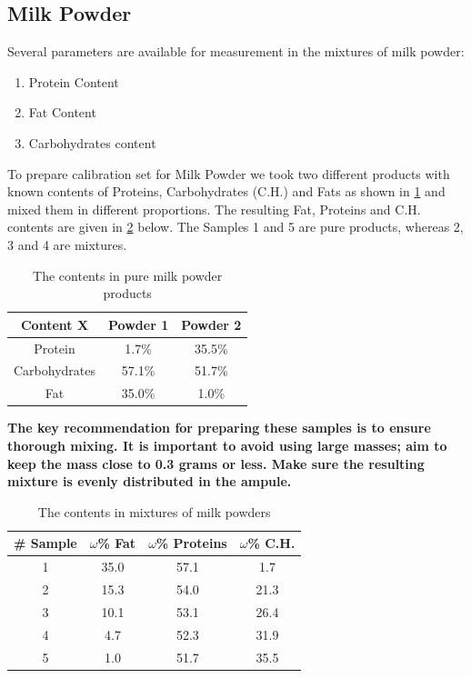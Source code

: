 \documentclass[a4paper,12pt]{article}
\begin{document}
\subsection{Milk Powder}
\label{sec:Milk Powder}
Several parameters are available for measurement in the mixtures of milk powder:
\begin{enumerate}
    \item Protein Content
    \item Fat Content
    \item Carbohydrates content
\end{enumerate}

To prepare calibration set for Milk Powder we took two different products with known contents of Proteins, Carbohydrates (C.H.) and Fats as shown in \cref{tab:Milk Pure}  and mixed them in different proportions. The resulting Fat, Proteins and C.H. contents are given in \cref{tab:Milk Mixture} below.
The Samples 1 and 5 are pure products, whereas 2, 3 and 4 are mixtures.

\begin{table}[ht!]
\centering
\caption{The contents in pure milk powder products}
\label{tab:Milk Pure}
\begin{tabular}{|c|c|c|}
\hline
Content   X   & Powder 1 & Powder 2 \\ \hline
Protein       & 1.7\%     & 35.5\%     \\ \hline
Carbohydrates & 57.1\%     & 51.7\%   \\ \hline
Fat           & 35.0\%     & 1.0\%   \\ \hline
\end{tabular}
\end{table}

\textbf{The key recommendation for preparing these samples is to ensure thorough mixing. It is important to avoid using large masses; aim to keep the mass close to 0.3 grams or less. Make sure the resulting mixture is evenly distributed in the ampule.
}

\begin{table}[H]
\centering
\caption{The contents in mixtures of milk powders}
\label{tab:Milk Mixture}
\begin{tabular}{|c|c|c|c|}
\hline
\textbf{\# Sample} & \textbf{$\omega$\% Fat} & \textbf{$\omega$\% Proteins} & \textbf{$\omega$\% C.H.} \\ \hline
1                  & 35.0             & 57.1                  & 1.7               \\ \hline
2                  & 15.3             & 54.0                  & 21.3              \\ \hline
3                  & 10.1             & 53.1                  & 26.4              \\ \hline
4                  & 4.7              & 52.3                  & 31.9              \\ \hline
5                  & 1.0              & 51.7                  & 35.5              \\ \hline
\end{tabular}
\end{table}
\end{document}
